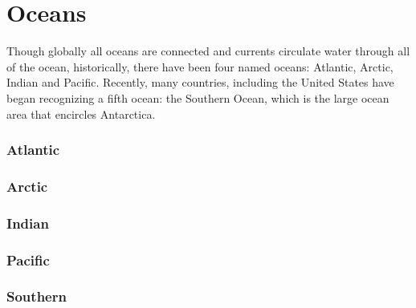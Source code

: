 	\section{Oceans}
		Though globally all oceans are connected and currents circulate water through all of the ocean, historically, there have been four named oceans: Atlantic, Arctic, Indian and Pacific. Recently, many countries, including the United States have began recognizing a fifth ocean: the Southern Ocean, which is the large ocean area that encircles Antarctica.  
		\subsubsection{Atlantic}
		\subsubsection{Arctic}
		\subsubsection{Indian}
		\subsubsection{Pacific}
		\subsubsection{Southern}
		
		

